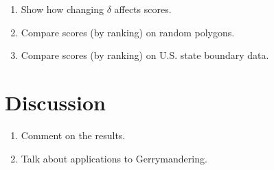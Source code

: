 \documentclass[]{jocg}
\theoremstyle{definition}
\theoremstyle{remark}
\begin{document}
\begin{enumerate}
  \item Show how changing $\delta$ affects scores.
  \item Compare scores (by ranking) on random polygons.
  \item Compare scores (by ranking) on U.S. state boundary data.
\end{enumerate}

\section{Discussion}

\begin{enumerate}
  \item Comment on the results.
  \item Talk about applications to Gerrymandering.
\end{enumerate}

\medskip

\printbibliography[heading=bibintoc]
\end{document}
